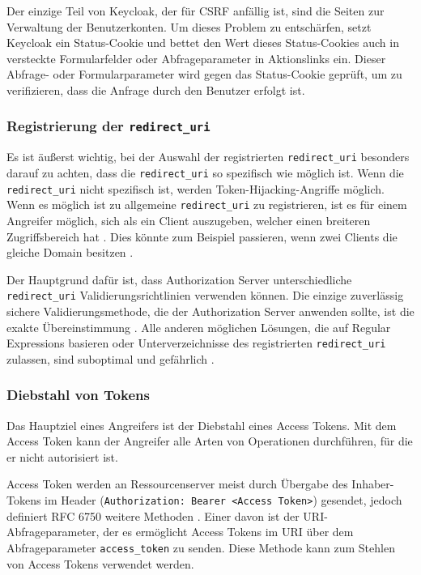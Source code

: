 Der einzige Teil von Keycloak, der für CSRF anfällig ist, sind die Seiten zur Verwaltung der Benutzerkonten. Um dieses Problem zu entschärfen, setzt Keycloak ein Status-Cookie und bettet den Wert dieses Status-Cookies auch in versteckte Formularfelder oder Abfrageparameter in Aktionslinks ein. Dieser Abfrage- oder Formularparameter wird gegen das Status-Cookie geprüft, um zu verifizieren, dass die Anfrage durch den Benutzer erfolgt ist. \cite{keycloakDocs}

\subsubsection{Registrierung der \texttt{redirect\_uri}}\label{Registrierung_redirect_uri}

Es ist äußerst wichtig, bei der Auswahl der registrierten \texttt{redirect\_uri} besonders darauf zu achten, dass die \texttt{redirect\_uri} so spezifisch wie möglich ist. Wenn die \texttt{redirect\_uri} nicht spezifisch ist, werden Token-Hijacking-Angriffe möglich. Wenn es möglich ist zu allgemeine \texttt{redirect\_uri} zu registrieren, ist es für einem Angreifer möglich, sich als ein Client auszugeben, welcher einen breiteren Zugriffsbereich hat \cite{keycloakDocs}. Dies könnte zum Beispiel passieren, wenn zwei Clients die gleiche Domain besitzen \cite{keycloakDocs}.

Der Hauptgrund dafür ist, dass Authorization Server unterschiedliche \texttt{redirect\_uri} Validierungsrichtlinien verwenden können. Die einzige zuverlässig sichere Validierungsmethode, die der Authorization Server anwenden sollte, ist die exakte Übereinstimmung \cite{OAuth2inAction}. Alle anderen möglichen Lösungen, die auf Regular Expressions basieren oder Unterverzeichnisse des registrierten \texttt{redirect\_uri} zulassen, sind suboptimal und gefährlich \cite{OAuth2inAction}.


\subsubsection{Diebstahl von Tokens}

Das Hauptziel eines Angreifers ist der Diebstahl eines Access Tokens. Mit dem Access Token kann der Angreifer alle Arten von Operationen durchführen, für die er nicht autorisiert ist. 

Access Token werden an Ressourcenserver meist durch Übergabe des Inhaber-Tokens im Header (\texttt{Authorization: Bearer <Access Token>}) gesendet, jedoch definiert RFC 6750 weitere Methoden \cite{RFC6750}. Einer davon ist der URI-Abfrageparameter, der es ermöglicht Access Tokens im URI über dem Abfrageparameter \texttt{access\_token} zu senden. Diese Methode kann zum Stehlen von Access Tokens verwendet werden. 

